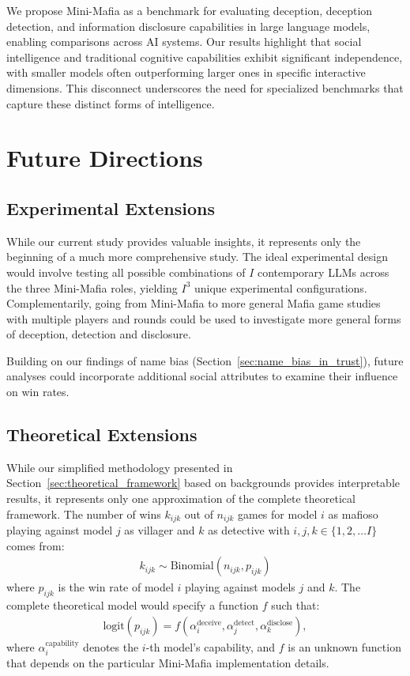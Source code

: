 \documentclass{article}
\begin{document}
We propose Mini-Mafia as a benchmark for evaluating deception, deception detection, and information disclosure capabilities in large language models, enabling comparisons across AI systems. Our results highlight that social intelligence and traditional cognitive capabilities exhibit significant independence, with smaller models often outperforming larger ones in specific interactive dimensions. This disconnect underscores the need for specialized benchmarks that capture these distinct forms of intelligence.

\section{Future Directions}
\label{sec:future_directions}

\subsection{Experimental Extensions}

While our current study provides valuable insights, it represents only the beginning of a much more comprehensive study. The ideal experimental design would involve testing all possible combinations of $I$ contemporary LLMs across the three Mini-Mafia roles, yielding $I^3$ unique experimental configurations. Complementarily, going from Mini-Mafia to more general Mafia game studies with multiple players and rounds could be used to investigate more general forms of deception, detection and disclosure.

Building on our findings of name bias (Section~\ref{sec:name_bias_in_trust}), future analyses could incorporate additional social attributes to examine their influence on win rates.

\subsection{Theoretical Extensions}
\label{sec:theoretical_extensions}

While our simplified methodology presented in Section~\ref{sec:theoretical_framework} based on backgrounds provides interpretable results, it represents only one approximation of the complete theoretical framework. The number of wins $k_{ijk}$ out of $n_{ijk}$ games for model $i$ as mafioso playing against model $j$ as villager and $k$ as detective with $i,j,k\in\{1,2,\dots I\}$ comes from:
\begin{align}
    k_{ijk}\sim \text{Binomial}(n_{ijk},p_{ijk})
\end{align}
where $p_{ijk}$ is the win rate of model $i$ playing against models $j$ and $k$. The complete theoretical model would specify a function $f$ such that:
\begin{align}
\text{logit}(p_{ijk}) = f(\alpha_i^{\text{deceive}}, \alpha_j^{\text{detect}}, \alpha_k^{\text{disclose}}),
\end{align}
where $\alpha_i^{\textrm{capability}}$ denotes the $i$-th model's capability, and $f$ is an unknown function that depends on the particular Mini-Mafia implementation details.
\end{document}
